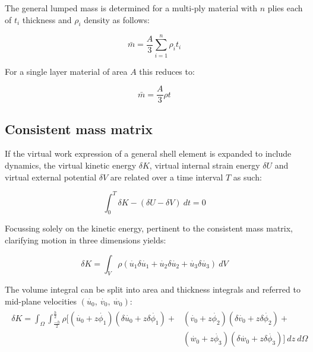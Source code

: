The general lumped mass is determined for a multi-ply material with $n$ plies each of $t_i$ thickness and $\rho_i$ density as follows:

\begin{equation} 
\bar{m} = \frac{A}{3} \sum_{i=1}^n \rho_i t_i
\label{eqt16}
\end{equation}

For a single layer material of area $A$ this reduces to:

\begin{equation} 
\bar{m} = \frac{A}{3} \rho t
\label{eqt17}
\end{equation}

\subsection{Consistent mass matrix}
If the virtual work expression of a general shell element is expanded to include dynamics, the virtual kinetic energy $\delta K$, virtual internal strain energy $\delta U$ and virtual external potential $\delta V$ are related over a time interval $T$ as such:

\begin{equation} 
\int_{0}^{T} \delta K - (\delta U - \delta V) \ dt = 0
\label{eqt17_1}
\end{equation}

Focussing solely on the kinetic energy, pertinent to the consistent mass matrix, clarifying motion in three dimensions yields:

\begin{equation} 
\delta K = \int_{V} \rho 
(
\dot{u_1} \delta \dot{u_1} + 
\dot{u_2} \delta \dot{u_2} + 
\dot{u_3} \delta \dot{u_3}
)
\ dV
\label{eqt17_2}
\end{equation}

The volume integral can be split into area and thickness integrals and referred to mid-plane velocities $(\dot{u_0},\ \dot{v_0},\ \dot{w_0})$:
\begin{gather} 
	\begin{aligned}
		\delta K = \int_{\Omega} \int_{\frac{-h}{2}}^{\frac{h}{2}} \rho 
		\Big[
		(\dot{u_0} + z\dot{\phi_1})  (\delta \dot{u_0} + z\delta\dot{\phi_1})+ 
		&(\dot{v_0} + z\dot{\phi_2})  (\delta \dot{v_0} + z\delta\dot{\phi_2})+
		\\
		&(\dot{w_0} + z\dot{\phi_3})  (\delta \dot{w_0} + z\delta\dot{\phi_3})
		\Big]
		\ dz
		\ d\Omega
		\label{eqt17_3}
	\end{aligned}
\end{gather}

